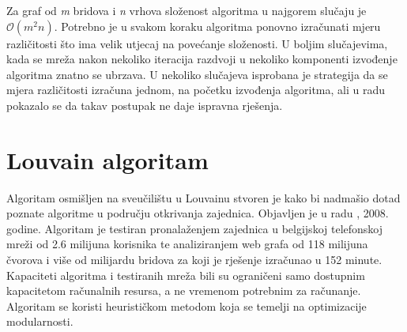 Za graf od \textit{m} bridova i \textit{n} vrhova složenost algoritma u najgorem slučaju je $\mathcal{O}(m^{2}n)$. Potrebno je u svakom koraku algoritma ponovno izračunati mjeru različitosti što ima velik utjecaj na povećanje složenosti. U boljim slučajevima, kada se mreža nakon nekoliko iteracija razdvoji u nekoliko komponenti izvođenje algoritma znatno se ubrzava. U nekoliko slučajeva isprobana je strategija da se mjera različitosti izračuna jednom, na početku izvođenja algoritma, ali u radu \cite{girvan2002community} pokazalo se da takav postupak ne daje ispravna rješenja.

\pagebreak

\section{Louvain algoritam}

Algoritam osmišljen na sveučilištu u Louvainu stvoren je kako bi nadmašio dotad poznate algoritme u području otkrivanja zajednica. Objavljen je u radu \cite{blondel2008fast}, 2008. godine. Algoritam je testiran pronalaženjem zajednica u belgijskoj telefonskoj mreži od 2.6 milijuna korisnika te analiziranjem web grafa od 118 milijuna čvorova i više od milijardu bridova za koji je rješenje izračunao u 152 minute. Kapaciteti algoritma i testiranih mreža bili su ograničeni samo dostupnim kapacitetom računalnih resursa, a ne vremenom potrebnim za računanje. Algoritam se koristi heurističkom metodom koja se temelji na optimizacije modularnosti. 

